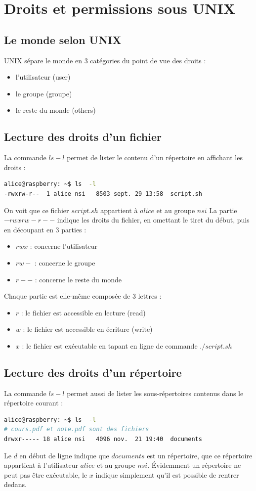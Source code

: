 \documentclass[a4paper,10pt]{article}
\begin{document}
\section{Droits et permissions sous UNIX}
\subsection{Le monde selon UNIX}
\setlength{\parindent}{8ex}UNIX sépare le monde en 3 catégories du point de vue des droits :
\begin{itemize}
	\item l'utilisateur (user)
	\item le groupe (groupe)
	\item le reste du monde (others)
\end{itemize}
\subsection{Lecture des droits d'un fichier}
La commande $ls -l$ permet de lister le contenu  d'un répertoire en affichant les droits : 
	\begin{lstlisting}[language=sh, frame = single]
alice@raspberry: ~$ ls  -l
-rwxrw-r--  1 alice nsi   8503 sept. 29 13:58  script.sh
\end{lstlisting}
\setlength{\parindent}{8ex}On voit que ce fichier $script.sh$ appartient à $alice$ et au groupe $nsi$
\newline
La partie $-rwxrw-r--$ indique les droits du fichier, en omettant le tiret du début, puis en découpant en 3 parties :
\begin{itemize}
	\item $rwx$ : concerne l'utilisateur
	\item $rw-$ : concerne le groupe
	\item $r--$ : concerne le reste du monde
\end{itemize}
Chaque partie est elle-même composée de 3 lettres :
\begin{itemize}
	\item $r$ : le fichier est accessible en lecture (read)
	\item $w$ : le fichier est accessible en écriture (write)
	\item $x$ : le fichier est exécutable en tapant en ligne de commande $./script.sh$
\end{itemize}
\subsection{Lecture des droits d'un répertoire}
La commande $ls -l$ permet aussi de lister les sous-répertoires contenus dans le répertoire courant :
\begin{lstlisting}[language=sh, frame = single]
alice@raspberry: ~$ ls  -l
# cours.pdf et note.pdf sont des fichiers
drwxr----- 18 alice nsi   4096 nov.  21 19:40  documents
\end{lstlisting} 
Le $d$ en début de ligne indique que $documents$ est un répertoire, que ce répertoire appartient à l'utilisateur $alice$ et au groupe $nsi$.
\newline Évidemment un répertoire ne peut pas être exécutable, le $x$ indique simplement qu'il est possible de rentrer dedans.
\end{document}
